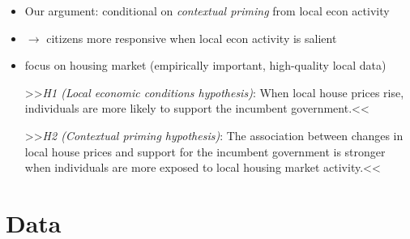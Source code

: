 \documentclass[10pt,aspectratio=169]{beamer}
\begin{document}
\begin{frame}
\begin{itemize}[<+->]
	\item Our argument: conditional on \textit{contextual priming} from local econ activity	
	\item $\rightarrow$ citizens more responsive when local econ activity is salient
	\item focus on housing market (empirically important, high-quality local data)
	\begin{exampleblock}{}
		>>\textit{H1 (Local economic conditions hypothesis)}: When local house prices rise, individuals are more likely to support the incumbent government.<<
	\end{exampleblock}
	\begin{exampleblock}{}
		>>\textit{H2 (Contextual priming hypothesis)}: The association between changes in local house prices and support for the incumbent government is stronger when individuals are more exposed to local housing market activity.<<
	\end{exampleblock}

\end{itemize}

\end{frame}

\section{Data}
\end{document}
